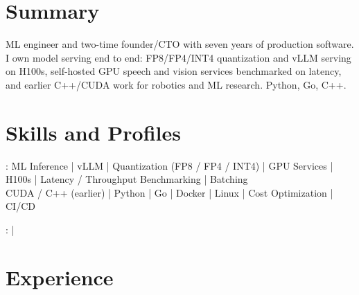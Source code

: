\documentclass[print]{jack-resume}
\begin{document}
\pagecolor{darkmodeBackground}


\begin{minipage}[t][1cm][t]{.03\textwidth}
    \hfill
\end{minipage}

\section{Summary}
ML engineer and two-time founder/CTO with seven years of production software. I own model serving end to end: FP8/FP4/INT4 quantization and vLLM serving on H100s, self-hosted GPU speech and vision services benchmarked on latency, and earlier C++/CUDA work for robotics and ML research. Python, Go, C++.
\sectionsep

\section{Skills and Profiles}
:
ML Inference \hfill | \hfill
vLLM \hfill | \hfill
Quantization (FP8 / FP4 / INT4) \hfill | \hfill
GPU Services \hfill | \hfill
H100s \hfill | \hfill
Latency / Throughput Benchmarking \hfill | \hfill
Batching \\
\hspace{1.0cm} CUDA / C++ (earlier) \hfill | \hfill
Python \hfill | \hfill
Go \hfill | \hfill
Docker \hfill | \hfill
Linux \hfill | \hfill
Cost Optimization \hfill | \hfill
CI/CD \\

\raggedright{
    :
      \href{https://www.linkedin.com/in/jack-sturtevant/}{ \ExternalLink} |
     \href{https://github.com/jacksturt}{ \ExternalLink}}

\section{Experience}
\end{document}
